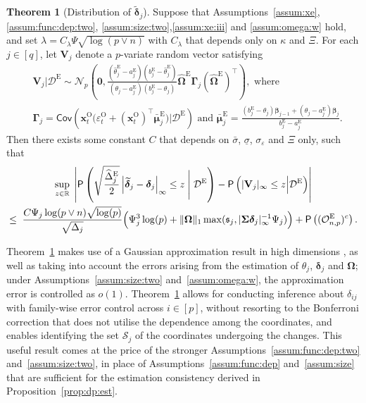 \documentclass[11pt, a4paper]{article}
\newcommand{\mbf}{\mathbf}
\newcommand{\mc}{\mathcal}
\newcommand{\vep}{\varepsilon}
\renewcommand{\l}{\left}
\renewcommand{\r}{\right}
\def\wh{\widehat}
\def\wc{\widetilde}
\newcommand{\cp}{\theta}
\newcommand{\Cov}[0]{\mathsf{Cov}}
\newcommand{\p}{\mathsf{P}}
\newcommand{\R}{\mathbb{R}}
\newcommand{\tE}{\text{E}}
\newcommand{\tO}{\text{O}}
\theoremstyle{definition}
\newtheorem{thm}{Theorem}
\theoremstyle{definition}
\theoremstyle{definition}
\theoremstyle{definition}
\theoremstyle{definition}
\theoremstyle{remark}
\theoremstyle{definition}
\theoremstyle{definition}
\theoremstyle{definition}
\begin{document}
\begin{thm}[Distribution of $\wc{\bm\delta}_j$]
	\label{thm:two}
	Suppose that Assumptions~\ref{assum:xe}, \ref{assum:func:dep:two}, \ref{assum:size:two},\ref{assum:xe:iii} and \ref{assum:omega:w} hold, and set
	$\lambda = C_\lambda \Psi \sqrt{\log(p \vee n)}$ with $C_\lambda$ that depends only on $\kappa$ and $\Xi$.
	For each $j \in [q]$, let $\mbf V_j$ denote a $p$-variate random vector satisfying 
	\begin{align*}
	& \mbf V_j \vert \mc D^{\tE} \sim \mc N_p\l(\mbf 0, \frac{(\wh\cp^{\tE}_j - a^{\tE}_j)(b^{\tE}_j - \wh\cp^{\tE}_j)}{(\cp_j - a^{\tE}_j)(b^{\tE}_j - \cp_j)} \wh{\bm\Omega}^{\tE} \bm\Gamma_j \l(\wh{\bm\Omega}^{\tE}\r)^\top \r), \text{ \ where}
	\\
	& \bm\Gamma_j = \Cov\l(\mbf x^{\tO}_t\bigl(\vep^{\tO}_t + (\mbf x^{\tO}_t)^\top\bar{\bm\mu}^{\tE}_j\bigr) \big\vert \mc D^{\tE} \r) \text{ \ and \ } \bar{\bm\mu}^{\tE}_j = \frac{(b^{\tE}_j - \cp_j) \bm\beta_{j - 1} + (\cp_j - a^{\tE}_j) \bm\beta_j}{b^{\tE}_j - a^{\tE}_j}.
	\end{align*}
	Then there exists some constant $C$ that depends on $\bar{\sigma}$, $\underline{\sigma}$, $\sigma_\vep$ and $\Xi$ only, 
	such that
	\begin{multline*}
	\sup_{z \in \R}\; \l\vert \p\l( 
	\sqrt{\frac{\wh\Delta^{\tE}_j}{2}}
	\l\vert \wc{\bm\delta}_j - \bm\delta_j \r\vert_\infty \le z \Biggm\vert \mc D^{\tE} \r) - \p\l(\vert \mbf V_j \vert_\infty \le z \Big\vert \mc D^{\tE} \r) \r\vert 
	\\
	\le \; \frac{C \Psi_j \log(p \vee n) \sqrt{\log(p)}}{\sqrt{\Delta_j}} \Bigl( \Psi_j^3 \log(p) 	+ \Vert \bm\Omega \Vert_1 \max( \mathfrak{s}_j, \vert \bm\Sigma \bm\delta_j \vert_\infty^{-1} \Psi_j) \Bigr) 
	+  \p\l( (\mc O_{n, p}^{\tE})^c \r).
	\end{multline*}
\end{thm}

Theorem~\ref{thm:two} makes use of a Gaussian approximation result in high dimensions \citep{CCK23}, as well as taking into account the errors arising from the estimation of $\cp_j$, $\bm\delta_j$ and $\bm\Omega$; under Assumptions~\ref{assum:size:two} and~\ref{assum:omega:w}, the approximation error is controlled as $o(1)$.
Theorem~\ref{thm:two} allows for conducting inference about $\delta_{ij}$ with family-wise error control across $i \in [p]$, without resorting to the Bonferroni correction that does not utilise the dependence among the coordinates, and enables identifying the set $\mc S_j$ 
of the coordinates undergoing the changes.
This useful result comes 
at the price of the stronger Assumptions~\ref{assum:func:dep:two} and~\ref{assum:size:two}, in place of Assumptions~\ref{assum:func:dep} and~\ref{assum:size} that are sufficient for the estimation consistency derived in Proposition~\ref{prop:dp:est}.
\end{document}
